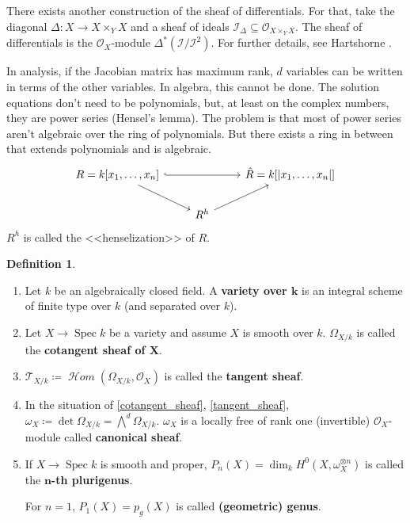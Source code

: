 \documentclass[12pt]{article}
\DeclareMathOperator{\Spec}{Spec}
\DeclareMathOperator{\shHom}{\mathcal H\textit{om}}
\theoremstyle{definition}
\newtheorem*{definition}{Definition}
\begin{document}
There exists another construction of the sheaf of differentials. For that, take the diagonal $\Delta:X\rightarrow X\times_YX$ and a sheaf of ideals $\mathcal I_\Delta\subseteq\mathcal O_{X\times_YX}$. The sheaf of differentials is the $\mathcal O_X$-module $\Delta^*(\mathcal I/\mathcal I^2)$. For further details, see Hartshorne \cite{hartshorne2013algebraic}.

In analysis, if the Jacobian matrix has maximum rank, $d$ variables can be written in terms of the other variables. In algebra, this cannot be done. The solution equations don't need to be polynomials, but, at least on the complex numbers, they are power series (Hensel's lemma). The problem is that most of power series aren't algebraic over the ring of polynomials. But there exists a ring in between that extends polynomials and is algebraic.
\[\begin{tikzcd}R=k[x_1,\ldots,x_n]\arrow[rr,hook]\arrow[rd]&&\hat R=k[|x_1,\ldots,x_n|]\\&R^h\arrow[ru]\end{tikzcd}\]
$R^h$ is called the <<henselization>> of $R$.

\begin{definition}
\begin{enumerate}[label=\arabic*)]
\item Let $k$ be an algebraically closed field. A \textbf{variety over $\boldsymbol k$} is an integral scheme of finite type over $k$ (and separated over $k$).

\item\label{cotangent_sheaf} Let $X\rightarrow\Spec k$ be a variety and assume $X$ is smooth over $k$. $\Omega_{X/k}$ is called the \textbf{cotangent sheaf of $\boldsymbol X$}.

\item\label{tangent_sheaf} $\mathcal T_{X/k}\coloneqq\shHom(\Omega_{X/k},\mathcal O_X)$ is called the \textbf{tangent sheaf}.

\item In the situation of \ref{cotangent_sheaf}, \ref{tangent_sheaf}, $\omega_X\coloneqq\det\Omega_{X/k}={\bigwedge}^d\Omega_{X/k}$. $\omega_X$ is a locally free of rank one (invertible) $\mathcal O_X$-module called \textbf{canonical sheaf}.

\item If $X\rightarrow\Spec k$ is smooth and proper, $P_n(X)=\dim_kH^0(X,\omega_X^{\otimes n})$ is called the \textbf{$\boldsymbol n$-th plurigenus}.

For $n=1$, $P_1(X)=p_g(X)$ is called \textbf{(geometric) genus}.
\end{enumerate}
\end{definition}
\end{document}
